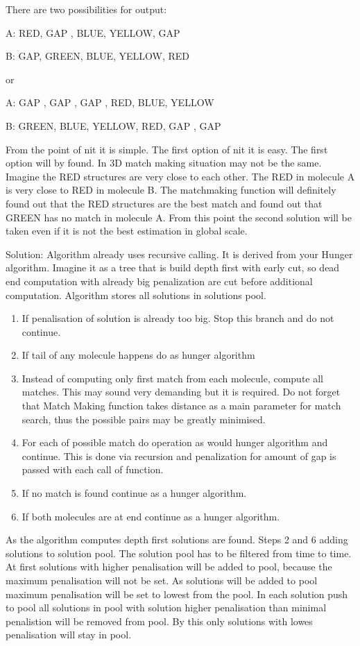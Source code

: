 \documentclass[twocolumn]{bmcart}%
\begin{document}
There are two possibilities for output:

A: RED, GAP  , BLUE, YELLOW, GAP

B: GAP, GREEN, BLUE, YELLOW, RED

or

A: GAP  , GAP , GAP   , RED, BLUE, YELLOW

B: GREEN, BLUE, YELLOW, RED, GAP , GAP   

From the point of nit it is simple. 
The first option of nit it is easy. 
The first option will by found. 
In 3D match making situation may not be the same. 
Imagine the RED structures are very close to each other. 
The RED in molecule A is very close to RED in molecule B. 
The matchmaking function will definitely found out that the RED structures are the best match and found out that GREEN has no match in molecule A.
From this point the second solution will be taken even if it is not the best estimation in global scale.

Solution:
Algorithm already uses recursive calling.
It is derived from your Hunger algorithm.
Imagine it as a tree that is build depth first with early cut, so dead end computation with already big penalization are cut before additional computation.
Algorithm stores all solutions in solutions pool.
 
\begin{enumerate}
	\item 
	If penalisation of solution is already too big.
	Stop this branch and do not continue.
	\item 
	If tail of any molecule happens do as hunger algorithm
  \item 
	Instead of computing only first match from each molecule, compute all matches.
	This may sound very demanding but it is required. 
	Do not forget that Match Making function takes distance as a main parameter for match search, thus the possible pairs may be greatly minimised.
	\item
	For each of possible match do operation as would hunger algorithm and continue.
	This is done via recursion and penalization for amount of gap is passed with each call of function.
  \item 
  If no match is found continue as a hunger algorithm.
  \item 
  If both molecules are at end continue as a hunger algorithm.
\end{enumerate}
As the algorithm computes depth first solutions are found. Steps 2 and 6 adding solutions to solution pool. The solution pool has to be filtered from time to time. At first solutions with higher penalisation will be added to pool, because the maximum penalisation will not be set. As solutions will be added to pool maximum penalisation will be set to lowest from the pool. In each solution push to pool all solutions in pool with solution higher penalisation than minimal penalistion will be removed from pool. By this only solutions with lowes penalisation will stay in pool.
\end{document}
